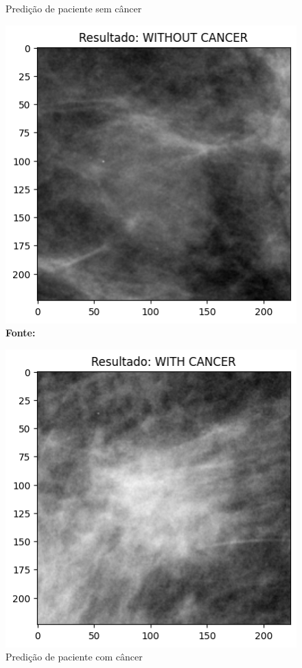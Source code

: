 \begin{figure}[ht]
\centering
    \begin{minipage}[b]{0.45\textwidth}
        \centering
        \caption{Predição de paciente sem câncer}
        \includegraphics[width=\textwidth]{figuras/predicao_sem.png}
        \label{fig:predicao_sem}
         \textbf{\footnotesize Fonte: \href{https://www.kaggle.com/datasets/awsaf49/cbis-ddsm-breast-cancer-image-dataset}{\cite{newdatabase}}}
    \end{minipage}
    \hfill
    \begin{minipage}[b]{0.45\textwidth}
        \centering
        \caption{Predição de paciente com câncer}
        \includegraphics[width=\textwidth]{figuras/predicao_com.png}

\end{minipage}
\end{figure}
